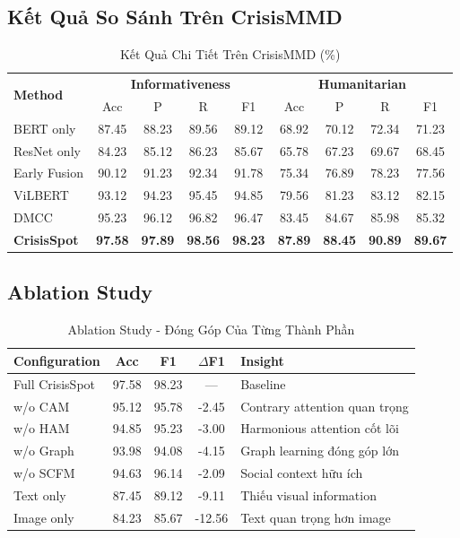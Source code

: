 \documentclass[12pt,a4paper]{article}
\begin{document}
\subsection{Kết Quả So Sánh Trên CrisisMMD}

\begin{table}[H]
\centering
\caption{Kết Quả Chi Tiết Trên CrisisMMD (\%)}
\label{tab:results_mmd}
\begin{tabular}{l|cccc|cccc}
\toprule
\multirow{2}{*}{\textbf{Method}} & \multicolumn{4}{c|}{\textbf{Informativeness}} & \multicolumn{4}{c}{\textbf{Humanitarian}} \\
& Acc & P & R & F1 & Acc & P & R & F1 \\
\midrule
BERT only & 87.45 & 88.23 & 89.56 & 89.12 & 68.92 & 70.12 & 72.34 & 71.23 \\
ResNet only & 84.23 & 85.12 & 86.23 & 85.67 & 65.78 & 67.23 & 69.67 & 68.45 \\
Early Fusion & 90.12 & 91.23 & 92.34 & 91.78 & 75.34 & 76.89 & 78.23 & 77.56 \\
ViLBERT & 93.12 & 94.23 & 95.45 & 94.85 & 79.56 & 81.23 & 83.12 & 82.15 \\
DMCC & 95.23 & 96.12 & 96.82 & 96.47 & 83.45 & 84.67 & 85.98 & 85.32 \\
\midrule
\textbf{CrisisSpot} & \textbf{97.58} & \textbf{97.89} & \textbf{98.56} & \textbf{98.23} & \textbf{87.89} & \textbf{88.45} & \textbf{90.89} & \textbf{89.67} \\
\bottomrule
\end{tabular}
\end{table}

\subsection{Ablation Study}

\begin{table}[H]
\centering
\caption{Ablation Study - Đóng Góp Của Từng Thành Phần}
\label{tab:ablation}
\begin{tabular}{l|c|c|c|l}
\toprule
\textbf{Configuration} & \textbf{Acc} & \textbf{F1} & \textbf{$\Delta$F1} & \textbf{Insight} \\
\midrule
Full CrisisSpot & 97.58 & 98.23 & --- & Baseline \\
\midrule
w/o CAM & 95.12 & 95.78 & -2.45 & Contrary attention quan trọng \\
w/o HAM & 94.85 & 95.23 & -3.00 & Harmonious attention cốt lõi \\
w/o Graph & 93.98 & 94.08 & -4.15 & Graph learning đóng góp lớn \\
w/o SCFM & 94.63 & 96.14 & -2.09 & Social context hữu ích \\
\midrule
Text only & 87.45 & 89.12 & -9.11 & Thiếu visual information \\
Image only & 84.23 & 85.67 & -12.56 & Text quan trọng hơn image \\
\bottomrule
\end{tabular}
\end{table}
\end{document}
